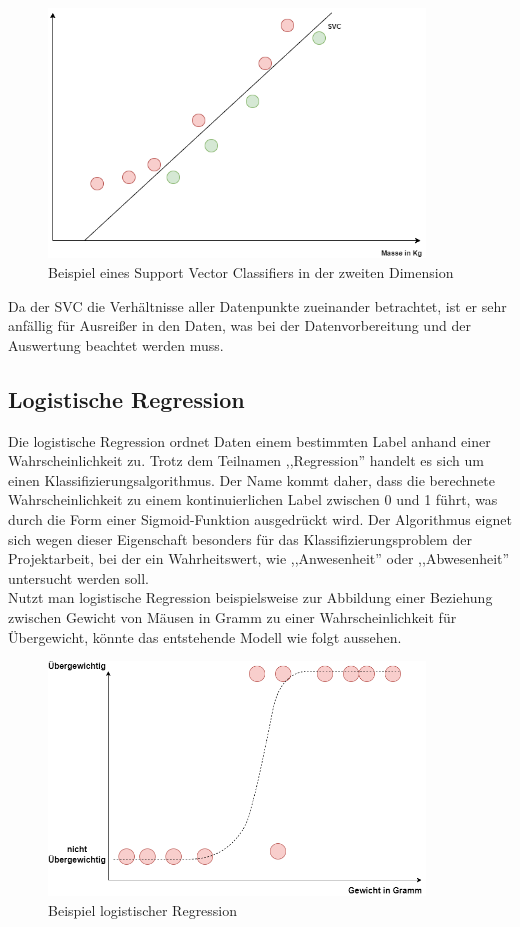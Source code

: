 \begin{figure}[h]
    \centering
    \includegraphics[width=10.0cm]{pic/SVC_2D.png}
    \caption{Beispiel eines Support Vector Classifiers in der zweiten Dimension}
    \label{fig:SVC_2D}
\end{figure}

Da der SVC die Verhältnisse aller Datenpunkte zueinander betrachtet, ist er sehr anfällig für Ausreißer in 
den Daten, was bei der Datenvorbereitung und der Auswertung beachtet werden muss.

\newpage
\subsection{Logistische Regression}

Die logistische Regression ordnet Daten einem bestimmten Label anhand einer Wahrscheinlichkeit zu. Trotz dem Teilnamen
,,Regression'' handelt es sich um einen Klassifizierungsalgorithmus. Der Name kommt daher, dass die berechnete Wahrscheinlichkeit
zu einem kontinuierlichen Label zwischen 0 und 1 führt, was durch die Form einer Sigmoid-Funktion ausgedrückt wird.
Der Algorithmus eignet sich wegen dieser Eigenschaft besonders für  das Klassifizierungsproblem der Projektarbeit, 
bei der ein Wahrheitswert, wie ,,Anwesenheit'' oder ,,Abwesenheit'' untersucht werden soll.\\
Nutzt man logistische Regression beispielsweise zur Abbildung einer Beziehung zwischen Gewicht von Mäusen in Gramm 
zu einer Wahrscheinlichkeit für Übergewicht, könnte das entstehende Modell wie folgt aussehen.

\begin{figure}[h]
    \centering
    \includegraphics[width=10.0cm]{pic/logistic_regression.png}
    \caption{Beispiel logistischer Regression}
    \label{fig:SVC_2D}
\end{figure}

